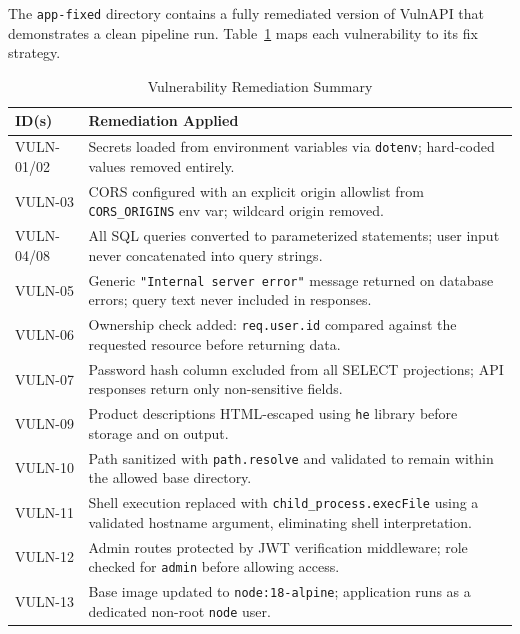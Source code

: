 \documentclass[10pt,conference]{IEEEtran}
\begin{document}
The \texttt{app-fixed} directory contains a fully remediated version of VulnAPI
that demonstrates a clean pipeline run.
Table~\ref{tab:fixes} maps each vulnerability to its fix strategy.

\begin{table}[t]
  \caption{Vulnerability Remediation Summary}
  \label{tab:fixes}
  \centering
  \scriptsize
  \begin{tabular}{@{}lp{5.5cm}@{}}
    \toprule
    ID(s) & Remediation Applied \\
    \midrule
    VULN-01/02 & Secrets loaded from environment variables via \texttt{dotenv};
                 hard-coded values removed entirely. \\
    VULN-03    & CORS configured with an explicit origin allowlist from
                 \texttt{CORS\_ORIGINS} env var; wildcard origin removed. \\
    VULN-04/08 & All SQL queries converted to parameterized statements;
                 user input never concatenated into query strings. \\
    VULN-05    & Generic \texttt{"Internal server error"} message returned on
                 database errors; query text never included in responses. \\
    VULN-06    & Ownership check added: \texttt{req.user.id} compared against
                 the requested resource before returning data. \\
    VULN-07    & Password hash column excluded from all SELECT projections;
                 API responses return only non-sensitive fields. \\
    VULN-09    & Product descriptions HTML-escaped using \texttt{he} library
                 before storage and on output. \\
    VULN-10    & Path sanitized with \texttt{path.resolve} and validated to
                 remain within the allowed base directory. \\
    VULN-11    & Shell execution replaced with \texttt{child\_process.execFile}
                 using a validated hostname argument, eliminating shell
                 interpretation. \\
    VULN-12    & Admin routes protected by JWT verification middleware;
                 role checked for \texttt{admin} before allowing access. \\
    VULN-13    & Base image updated to \texttt{node:18-alpine}; application runs
                 as a dedicated non-root \texttt{node} user. \\
    \bottomrule
  \end{tabular}
\end{table}
\end{document}
